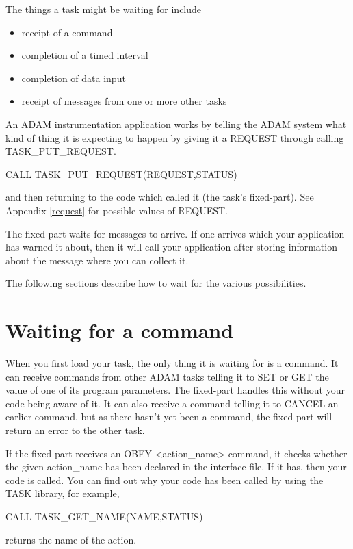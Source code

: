 \documentclass[twoside,11pt,nolof]{starlink}
\begin{document}
The things a task might be waiting for include
\begin{itemize}
\item receipt of a command
\item completion of a timed interval
\item completion of data input
\item receipt of messages from one or more other tasks
\end{itemize}
An ADAM instrumentation application works by telling the ADAM system
what kind of thing it is expecting to happen by giving it a REQUEST
through calling TASK\_PUT\_REQUEST.

\begin{small}
\begin{terminalv}
CALL TASK_PUT_REQUEST(REQUEST,STATUS)
\end{terminalv}
\end{small}

and then returning to the code which called it (the task's fixed-part).
See Appendix \ref{request} for possible values of REQUEST.

The fixed-part waits for messages to arrive. If one arrives which your
application has warned it about, then it will call your application
after storing information about the message where you can collect it.

The following sections describe how to wait for the various
possibilities.

\section{Waiting for a command}

When you first load your task, the only thing it is waiting for is a
command. It can receive commands from other ADAM tasks telling it to SET
or GET the value of one of its program parameters. The fixed-part
handles this without your code being aware of it. It can also receive a
command telling it to CANCEL an earlier command, but as there hasn't yet
been a command, the fixed-part will return an error to the other task.

If the fixed-part receives an OBEY <action\_name> command, it checks
whether the given action\_name has been declared in the interface file.
If it has, then your code is called. You can find out why your code has
been called by using the TASK library, for example,
\begin{small}
\begin{terminalv}
CALL TASK_GET_NAME(NAME,STATUS)
\end{terminalv}
\end{small}
returns the name of the action.
\end{document}
